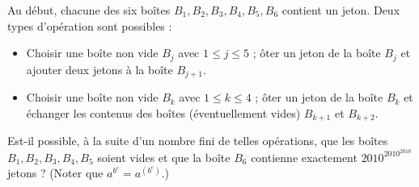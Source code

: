 Au début, chacune des six boîtes $B_1, B_2, B_3, B_4, B_5, B_6$ contient un jeton. Deux types d'opération
sont possibles :
\begin{itemize}
  \item[\emph{Type} 1 :] Choisir une boîte non vide $B_j$ avec $1 \leqslant j \leqslant 5$ ; ôter un jeton de la
  boîte $B_j$ et ajouter deux jetons à la boîte $B_{j+1}$.
  \item[\emph{Type} 2 :] Choisir une boîte non vide $B_k$ avec $1 \leqslant k \leqslant 4$ ; ôter un jeton de la
  boîte $B_k$ et échanger les contenus des boîtes (éventuellement vides) $B_{k+1}$ et $B_{k+2}$.
\end{itemize}
Est-il possible, à la suite d'un nombre fini de telles opérations, que les boîtes $B_1, B_2, B_3, B_4, B_5$
soient vides et que la boîte $B_6$ contienne exactement $2010^{2010^{2010}}$ jetons ? (Noter que
$a^{b^c} = a^{(b^c)}$.)

